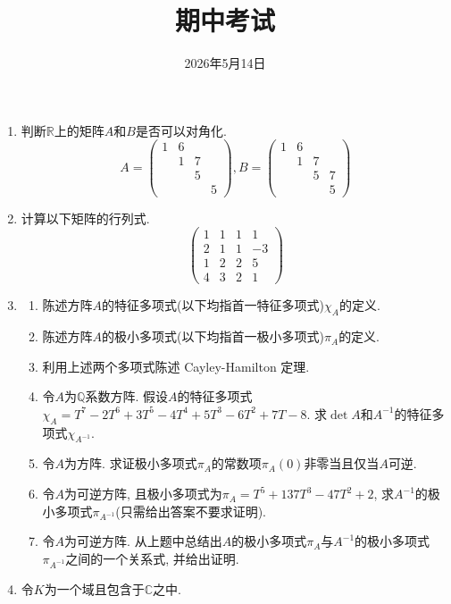 \documentclass[
  a4paper,
]{article}
\title{期中考试}
\author{}
\date{2026年5月14日}
\providecommand{\tightlist}{\setlength{\itemsep}{0pt}\setlength{\parskip}{0pt}}
\begin{document}
\maketitle

\pagestyle{fancy}
\fancyhf{}


\renewcommand{\headrulewidth}{1pt}
\rfoot{\thepage}

\begin{enumerate}
\def\labelenumi{\arabic{enumi}.}
\tightlist
\item
  判断\(\mathbb{R}\)上的矩阵\(A\)和\(B\)是否可以对角化. \[
   A = \begin{pmatrix}
   1 & 6 & & \\
   & 1 & 7 & \\
   & & 5 & \\
   & & & 5
   \end{pmatrix},
   B = \begin{pmatrix}
   1 & 6 & & \\
   & 1 & 7 & \\
   & & 5 & 7 \\
   & & & 5
   \end{pmatrix}
   \]
\item
  计算以下矩阵的行列式. \[
   \begin{pmatrix}
   1 & 1 & 1 & 1 \\
   2 & 1 & 1 & -3 \\
   1 & 2 & 2 & 5 \\
   4 & 3 & 2 & 1 
   \end{pmatrix}
   \]
\item
  \begin{enumerate}
  \def\labelenumii{\arabic{enumii}.}
  \tightlist
  \item
    陈述方阵\(A\)的特征多项式(以下均指首一特征多项式)\(\chi_A\)的定义.
  \item
    陈述方阵\(A\)的极小多项式(以下均指首一极小多项式)\(\pi_A\)的定义.
  \item
    利用上述两个多项式陈述 Cayley-Hamilton 定理.
  \item
    令\(A\)为\(\mathbb{Q}\)系数方阵.
    假设\(A\)的特征多项式\(\chi_A = T^7 - 2T^6 + 3T^5 - 4T^4 + 5T^3 - 6T^2 + 7T - 8\).
    求\(\det A\)和\(A^{-1}\)的特征多项式\(\chi_{A^{-1}}\).
  \item
    令\(A\)为方阵.
    求证极小多项式\(\pi_A\)的常数项\(\pi_A(0)\)非零当且仅当\(A\)可逆.
  \item
    令\(A\)为可逆方阵,
    且极小多项式为\(\pi_A = T^5 + 137T^3 - 47T^2 + 2\),
    求\(A^{-1}\)的极小多项式\(\pi_{A^{-1}}\)(只需给出答案不要求证明).
  \item
    令\(A\)为可逆方阵.
    从上题中总结出\(A\)的极小多项式\(\pi_A\)与\(A^{-1}\)的极小多项式\(\pi_{A^{-1}}\)之间的一个关系式,
    并给出证明.
  \end{enumerate}
\item
  令\(K\)为一个域且包含于\(\mathbb{C}\)之中.


\end{enumerate}
\end{document}
